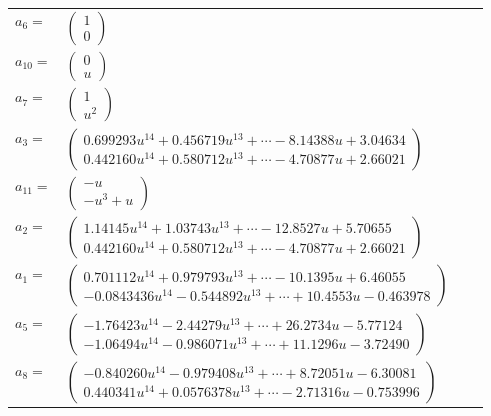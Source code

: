 \documentclass[1p]{elsarticle_modified}
\theoremstyle{definition}
\begin{document}
\begin{tabular}{m{7pt} m{180pt} m{7pt} m{180pt} }
\flushright $a_{6}=$&$\begin{pmatrix}1\\0\end{pmatrix}$ \\
\flushright $a_{10}=$&$\begin{pmatrix}0\\u\end{pmatrix}$ \\
\flushright $a_{7}=$&$\begin{pmatrix}1\\u^2\end{pmatrix}$ \\
\flushright $a_{3}=$&$\begin{pmatrix}0.699293 u^{14}+0.456719 u^{13}+\cdots-8.14388 u+3.04634\\0.442160 u^{14}+0.580712 u^{13}+\cdots-4.70877 u+2.66021\end{pmatrix}$ \\
\flushright $a_{11}=$&$\begin{pmatrix}- u\\- u^3+u\end{pmatrix}$ \\
\flushright $a_{2}=$&$\begin{pmatrix}1.14145 u^{14}+1.03743 u^{13}+\cdots-12.8527 u+5.70655\\0.442160 u^{14}+0.580712 u^{13}+\cdots-4.70877 u+2.66021\end{pmatrix}$ \\
\flushright $a_{1}=$&$\begin{pmatrix}0.701112 u^{14}+0.979793 u^{13}+\cdots-10.1395 u+6.46055\\-0.0843436 u^{14}-0.544892 u^{13}+\cdots+10.4553 u-0.463978\end{pmatrix}$ \\
\flushright $a_{5}=$&$\begin{pmatrix}-1.76423 u^{14}-2.44279 u^{13}+\cdots+26.2734 u-5.77124\\-1.06494 u^{14}-0.986071 u^{13}+\cdots+11.1296 u-3.72490\end{pmatrix}$ \\
\flushright $a_{8}=$&$\begin{pmatrix}-0.840260 u^{14}-0.979408 u^{13}+\cdots+8.72051 u-6.30081\\0.440341 u^{14}+0.0576378 u^{13}+\cdots-2.71316 u-0.753996\end{pmatrix}$ \\

\end{tabular}
\end{document}
